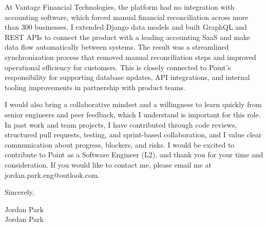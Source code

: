 \documentclass[11pt]{letter}
\newcommand{\myname}{Jordan Park}
\newcommand{\closer}{Sincerely}
\begin{document}
At Vantage Financial Technologies, the platform had no integration with accounting software, which forced manual financial reconciliation across more than 300 businesses. I extended Django data models and built GraphQL and REST APIs to connect the product with a leading accounting SaaS and make data flow automatically between systems. The result was a streamlined synchronization process that removed manual reconciliation steps and improved operational efficiency for customers. This is closely connected to Point's responsibility for supporting database updates, API integrations, and internal tooling improvements in partnership with product teams.

I would also bring a collaborative mindset and a willingness to learn quickly from senior engineers and peer feedback, which I understand is important for this role. In past work and team projects, I have contributed through code reviews, structured pull requests, testing, and sprint-based collaboration, and I value clear communication about progress, blockers, and risks. I would be excited to contribute to Point as a Software Engineer (L2), and thank you for your time and consideration. If you would like to contact me, please email me at jordan.park.eng@outlook.com.

\vspace{0.1in}

\begin{flushleft}
\closer,

\large
{\LARGE\calligra\myname}\\[4mm]

\myname\\
\end{flushleft}
\end{document}
